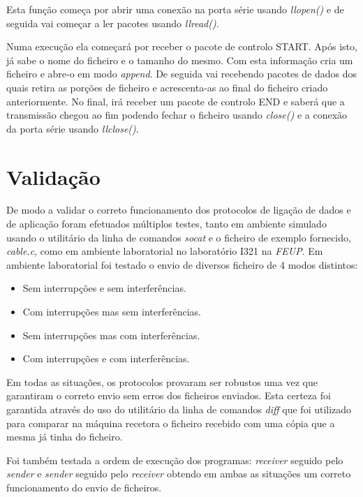 \documentclass[a4paper,11pt,portuguese]{article}
\begin{document}
    \noindent Esta função começa por abrir uma conexão na porta série usando \textit{llopen()}
    e de seguida vai começar a ler pacotes usando \textit{llread()}.

    Numa execução ela começará por receber o pacote de controlo START. Após isto, já sabe o nome do ficheiro
    e o tamanho do mesmo. Com esta informação cria um ficheiro e abre-o em modo \textit{append}.
    De seguida vai recebendo pacotes de dados dos quais retira as porções de ficheiro e acrescenta-as ao
    final do ficheiro criado anteriormente. No final, irá receber um pacote de controlo END e saberá
    que a transmissão chegou ao fim podendo fechar o ficheiro usando \textit{close()} e a conexão da porta série
    usando \textit{llclose()}.


\section{Validação}

    De modo a validar o correto funcionamento dos protocolos de ligação de dados
    e de aplicação foram efetuados múltiplos testes, tanto em ambiente simulado usando
    o utilitário da linha de comandos \textit{socat} e o ficheiro de exemplo fornecido,
    \textit{cable.c}, como em ambiente laboratorial no laboratório I321 na
    \textit{FEUP}. Em ambiente laboratorial foi testado o envio de diversos ficheiro
    de 4 modos distintos:

    \begin{itemize}
        \item Sem interrupções e sem interferências.
        \item Com interrupções mas sem interferências.
        \item Sem interrupções mas com interferências.
        \item Com interrupções e com interferências.
    \end{itemize}

    Em todas as situações, os protocolos provaram ser robustos uma vez que garantiram o
    correto envio sem erros dos ficheiros enviados. Esta certeza foi garantida através do
    uso do utilitário da linha de comandos \textit{diff} que foi utilizado para comparar
    na máquina recetora o ficheiro recebido com uma cópia que a mesma já tinha do ficheiro. \par

    Foi também testada a ordem de execução dos programas: \textit{receiver} seguido pelo
    \textit{sender} e \textit{sender} seguido pelo \textit{receiver} obtendo
    em ambas as situações um correto funcionamento do envio de ficheiros.
\end{document}
